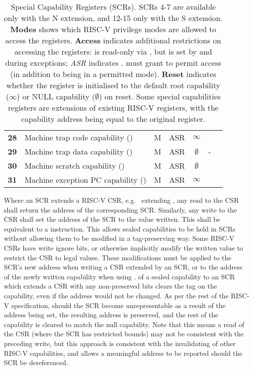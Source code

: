 \begin{table}[h!]
\begin{tabular}{cllcccc@{}}
\textbf{28} & Machine trap code capability (\MTCC{})     & M & ASR & $\infty$    & \mtvec{} \\
\textbf{29} & Machine trap data capability (\MTDC{})     & M & ASR & $\emptyset$ & -        \\
\textbf{30} & Machine scratch capability (\MScratchC{})  & M & ASR & $\emptyset$ & \mscratch{} \\
\textbf{31} & Machine exception PC capability (\MEPCC{}) & M & ASR & $\infty$    & \mepc{}  \\
\bottomrule
\end{tabular}
\caption{Special Capability Registers (SCRs).
SCRs 4-7 are available only with the N extension, and 12-15 only with the S
extension.
\textbf{Modes} shows which RISC-V privilege modes are allowed to access the
registers.
\textbf{Access} indicates additional restrictions on accessing the registers:
\PCC{} is read-only via , but is set by
 and during exceptions; \textit{ASR} indicates
\PCC{}.\cperms{} must grant \cappermASR{} to permit access (in addition to
being in a permitted mode).
\textbf{Reset} indicates whether the register is initialised to the default
root capability ($\infty$) or NULL capability ($\emptyset$) on reset.
Some special capabilities registers are extensions of existing RISC-V
registers, with the capability address being equal to the original register.
}
\label{tab:risc-v-special-capability-registers}
\end{table}

Where an SCR extends a RISC-V CSR, e.g.\ \MTCC{} extending \mtvec{},
any read to the CSR shall return the address of the corresponding SCR.
Similarly, any write to the CSR shall set the address of the SCR to the value
written.
This shall be equivalent to a  instruction.
This allows sealed capabilities to be held in SCRs without allowing them to
be modified in a tag-preserving way.
Some RISC-V CSRs have write ignore bits, or otherwise implicitly modify
the written value to restrict the CSR to legal values.
These modifications must be applied to the SCR's new address when writing a CSR
extended by an SCR, or to the address of the newly written capability when
using .
 of a sealed capability to an SCR which extends a CSR
with any non-preserved bits clears the tag on the capability, even if the
address would not be changed.
As per the rest of the RISC-V specification, should the SCR become
unrepresentable as a result of the address being set, the resulting address is
preserved, and the rest of the capability is cleared to match the null
capability.
Note that this means a read of the CSR (where the SCR has restricted bounds)
may not be consistent with the preceding write, but this approach is
consistent with the invalidating of other RISC-V capabilities, and allows a
meaningful address to be reported should the SCR be dereferenced.

